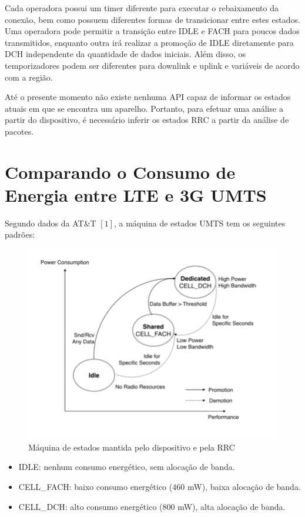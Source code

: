 \documentclass{article}
\begin{document}
Cada operadora possui um timer diferente para executar o rebaixamento da conexão, bem como possuem diferentes formas de
transicionar entre estes estados. Uma operadora pode permitir a transição entre IDLE e FACH para poucos dados
transmitidos, enquanto outra irá realizar a promoção de IDLE diretamente para DCH independente da quantidade de dados
iniciais. Além disso, os temporizadores podem ser diferentes para downlink e uplink e variáveis de acordo com a região.

Até o presente momento não existe nenhuma API capaz de informar os estados atuais em que se encontra um aparelho.
Portanto, para efetuar uma análise a partir do dispositivo, é necessário inferir os estados RRC a partir da análise de
pacotes.

\section{Comparando o Consumo de Energia entre LTE e 3G UMTS}
Segundo dados da AT\&T $[1]$, a máquina de estados UMTS tem os seguintes padrões:

\begin{figure}[!h]
\includegraphics[width=\textwidth]{umts-state-machine}
\caption{Máquina de estados mantida pelo dispositivo e pela RRC}
\centering
\end{figure}

\begin{itemize}
\item IDLE: nenhum consumo energético, sem alocação de banda.
\item CELL\_FACH: baixo consumo energético (460 mW), baixa alocação de banda.
\item CELL\_DCH: alto consumo energético (800 mW), alta alocação de banda.
\end{itemize}
\end{document}
